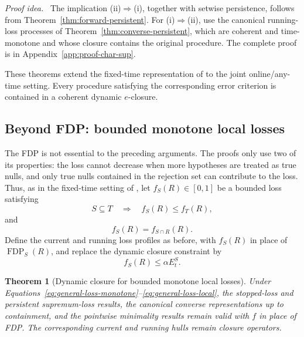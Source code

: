 \documentclass[11pt]{article}
\numberwithin{equation}{section}
\theoremstyle{plain}
\newtheorem{theorem}{Theorem}[section]
\theoremstyle{definition}
\newcommand{\FDP}{\operatorname{FDP}}
\newcommand{\proofidea}{\par\medskip\noindent\textit{Proof idea.}\ }
\begin{document}
\proofidea
The implication (ii)$\Rightarrow$(i), together with setwise persistence, follows from Theorem~\ref{thm:forward-persistent}. For (i)$\Rightarrow$(ii), use the canonical running-loss processes of Theorem~\ref{thm:converse-persistent}, which are coherent and time-monotone and whose closure contains the original procedure. The complete proof is in Appendix~\ref{app:proof-char-sup}.

These theorems extend the fixed-time representation of \citet{XuEtAl2026Closure} to the joint online/any-time setting. Every procedure satisfying the corresponding error criterion is contained in a coherent dynamic $e$-closure. 


\subsection{Beyond FDP: bounded monotone local losses}\label{sec:general-losses}

The FDP is not essential to the preceding arguments. The proofs only use two of its properties: the loss cannot decrease when more hypotheses are treated as true nulls, and only true nulls contained in the rejection set can contribute to the loss. Thus, as in the fixed-time setting of \citet{XuEtAl2026Closure}, let $f_S(R)\in[0,1]$ be a bounded loss satisfying
\begin{equation}\label{eq:general-loss-monotone}
	S\subseteq T\quad\Longrightarrow\quad f_S(R)\leq f_T(R),
\end{equation}
and
\begin{equation}\label{eq:general-loss-local}
	f_S(R)=f_{S\cap R}(R).
\end{equation}
Define the current and running loss profiles as before, with $f_S(R)$ in place of $\FDP_S(R)$, and replace the dynamic closure constraint by
\begin{equation}
	f_S(R)\leq \alpha E_t^S.
\end{equation}

\begin{theorem}[Dynamic closure for bounded monotone local losses]\label{thm:general-loss}
	Under Equations~\eqref{eq:general-loss-monotone}--\eqref{eq:general-loss-local}, the stopped-loss and persistent supremum-loss results, the canonical converse representations up to containment, and the pointwise minimality results remain valid with $f$ in place of FDP. The corresponding current and running hulls remain closure operators.
\end{theorem}
\end{document}
